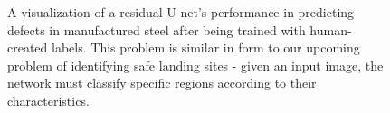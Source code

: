 \begin{figure}
    \caption{A visualization of a residual U-net's performance in predicting defects in manufactured steel after being trained with human-created labels.
    This problem is similar in form to our upcoming problem of identifying safe landing sites - given an input image,
        the network must classify specific regions according to their characteristics.}
    \label{figure:example_steel_prediction}
\end{figure}